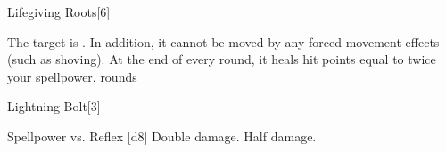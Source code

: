 \begin{spellsection}{Lifegiving Roots}[6]
    \begin{spellheader}
    \end{spellheader}
    \begin{spellcontent}
        \begin{spelltargetinginfo}
        \end{spelltargetinginfo}
        \begin{spelleffects}
            \spellsuccess The target is \immobilized. In addition, it cannot be moved by any forced movement effects (such as shoving). At the end of every round, it heals hit points equal to twice your spellpower.
             rounds
        \end{spelleffects}
    \end{spellcontent}
    \begin{spellfooter}
        \miscastexplode
    \end{spellfooter}
\end{spellsection}

\begin{spellsection}{Lightning Bolt}[3]
    \begin{spellheader}
    \end{spellheader}
    \begin{spellcontent}
        \begin{spelltargetinginfo}
        \end{spelltargetinginfo}
        \begin{spelleffects}
            \begin{spellattack}{Spellpower vs. Reflex}
                \spellsuccess {}[d8]
                \spellcritical Double damage.
                \spellfailure Half damage.
            \end{spellattack}
        \end{spelleffects}
    \end{spellcontent}
    \begin{spellfooter}
        \spellnotes \destructivespellnotes
        \miscastexplode
    \end{spellfooter}
    \begin{spellaugments}
    \end{spellaugments}
\end{spellsection}

